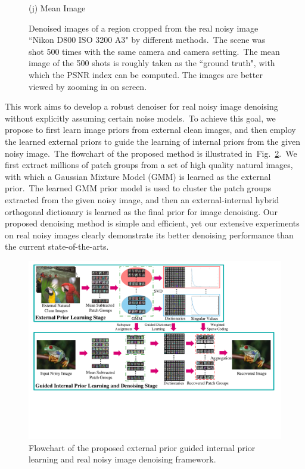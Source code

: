 \documentclass[10pt,twocolumn,letterpaper]{article}
\begin{document}
\begin{figure}
{\begin{minipage}[t]{0.195\textwidth}
{\footnotesize (j) Mean Image \cite{crosschannel2016} }
\end{minipage}
}
\caption{Denoised images of a region cropped from the real noisy image ``Nikon D800 ISO 3200 A3" \cite{crosschannel2016} by different methods.\ The scene was shot 500 times with the same camera and camera setting.\ The mean image of the 500 shots is roughly taken as the ``ground truth", with which the PSNR index can be computed. The images are better viewed by zooming in on screen.} 
\label{fig1}
\end{figure}

This work aims to develop a robust denoiser for real noisy image denoising without explicitly assuming certain noise models.\ To achieve this goal, we propose to first learn image priors from external clean images, and then employ the learned external priors to guide the learning of internal priors from the given noisy image.\ The flowchart of the proposed method is illustrated in\ Fig.\ \ref{fig2}.\ We first extract millions of patch groups from a set of high quality natural images, with which a Gaussian Mixture Model (GMM) is learned as the external prior.\ The learned GMM prior model is used to cluster the patch groups extracted from the given noisy image, and then an external-internal hybrid orthogonal dictionary is learned as the final prior for image denoising. Our proposed denoising method is simple and efficient, yet our extensive experiments on real noisy images clearly demonstrate its better denoising performance than the current state-of-the-arts.

\begin{figure}\vspace{-2mm}
\centering
\includegraphics[width=0.95\linewidth]{Flowchart.pdf}
\vspace{-32mm}
\caption{Flowchart of the proposed external prior guided internal prior learning and real noisy image denoising framework.
}
\vspace{-1mm}
\label{fig2}
\end{figure}
\end{document}

